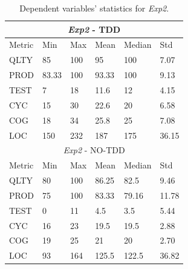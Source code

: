 \begin{table}[H]
    \begin{center} 
        \begin{tabular}{ |p{2cm}||p{1.6cm}|p{1.6cm}|p{1.6cm}|p{1.6cm}|p{1.6cm}|}
            \hline
                \multicolumn{6}{|c|}{\textit{Exp2} - TDD} \\
            \hline
                Metric & Min & Max & Mean & Median & Std\\
            \hline
                QLTY & 85 & 100 & 95 & 100 & 7.07 \\
                PROD & 83.33 & 100 & 93.33 & 100 & 9.13 \\
                TEST & 7 & 18 & 11.6 & 12 & 4.15 \\
                CYC & 15 & 30 & 22.6 & 20 & 6.58 \\
                COG & 18 & 34 & 25.8 & 25 & 7.08 \\
                LOC & 150 & 232 & 187 & 175 & 36.15 \\
            \hline\hline
                \multicolumn{6}{|c|}{\textit{Exp2} - NO-TDD} \\
            \hline
                Metric & Min & Max & Mean & Median & Std\\
            \hline
                QLTY & 80 & 100 & 86.25 & 82.5 & 9.46 \\
                PROD & 75 & 100 & 83.33 & 79.16 & 11.78 \\
                TEST & 0 & 11 & 4.5 & 3.5 & 5.44 \\
                CYC & 16 & 23 & 19.5 & 19.5 & 2.88 \\
                COG & 19 & 25 & 21 & 20 & 2.70 \\
                LOC & 93 & 164 & 125.5 & 122.5 & 36.82 \\
            \hline
        \end{tabular}
        \caption{\label{tab_dv_t3}Dependent variables' statistics for \textit{Exp2}.}
    \end{center}
\end{table}

